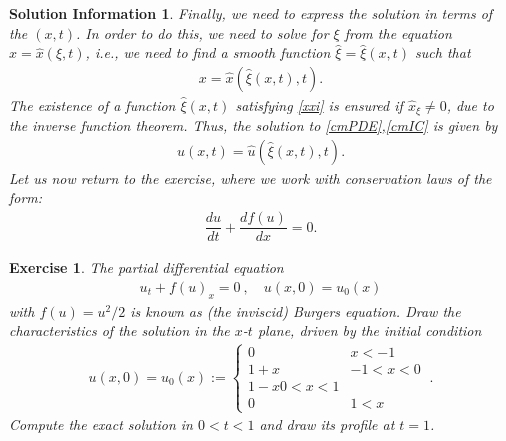 \documentclass[10pt,letterpaper]{article}
\newcommand{\frb}[1]{ \left(  {#1} \right) }
\theoremstyle{break}
\newtheorem{exercise}{Exercise}
\newtheorem*{solutioninformation}{Solution Information}
\begin{document}
\begin{solutioninformation}
	Finally, we need to express the solution in terms of the $(x,t)$. In order to do this, we need to solve for $\xi$ from the equation $x = \hat x\frb{\xi,t}$, i.e., we need to find a smooth function $\hat \xi=\hat \xi(x,t)$ such that
	\begin{gather} \label{xxi}
		x=\hat x\frb{\hat \xi(x,t),t}.
	\end{gather}
	The existence of a function $\hat \xi(x,t)$ satisfying \eqref{xxi} is ensured if $\hat x_\xi\ne0$, due to the inverse function theorem. Thus, the solution to \eqref{cmPDE},\eqref{cmIC} is given by
	\begin{gather} \label{cmSol}
		u(x,t)=\hat u\frb{\hat \xi(x,t) ,t}.
	\end{gather}
	Let us now return to the exercise, where we work with conservation laws of the form:
	\begin{gather} 
		\dfrac{du}{dt}+\dfrac{d f(u)}{dx}=0.
	\end{gather}
\end{solutioninformation}

\begin{exercise}
	The partial differential equation 
	\begin{gather}
		u_t+f(u)_x=0\ ,
		\quad
		u(x,0)=u_0(x)
	\end{gather}%
	with $f(u)=u^2/2$ is known as (the inviscid) Burgers equation. Draw the characteristics of the solution in the $x$-$t$ plane, driven by the initial condition
	\begin{gather} \label{inCond1}
		u(x,0)=
		u_0(x):=\begin{cases}
				0 	&   x< -1
				\\
				1+x & -1 < x<0
				\\
				1-x    0 < x<1
				\\
				0 	&  1 < x
			\end{cases}\ .
	\end{gather}
	Compute the exact solution in $0<t<1$ and draw its profile at $t=1$.
\end{exercise}
\end{document}
